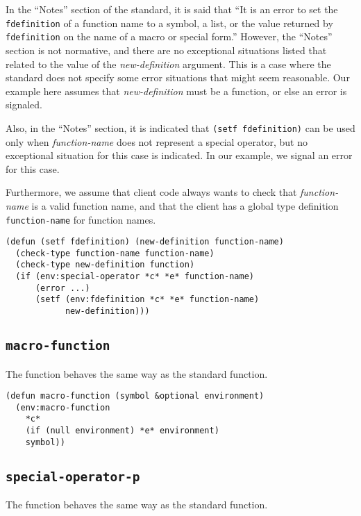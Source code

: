 In the ``Notes'' section of the \commonlisp{} standard, it is said
that ``It is an error to set the \texttt{fdefinition} of a function
name to a symbol, a list, or the value returned by
\texttt{fdefinition} on the name of a macro or special form.''
However, the ``Notes'' section is not normative, and there are no
exceptional situations listed that related to the value of the
\textit{new-definition} argument.  This is a case where the standard
does not specify some error situations that might seem reasonable.
Our example here assumes that \textit{new-definition} must be a
function, or else an error is signaled.

Also, in the ``Notes'' section, it is indicated that \texttt{(setf
  fdefinition)} can be used only when \textit{function-name} does not
represent a special operator, but no exceptional situation for this
case is indicated.  In our example, we signal an error for this case.

Furthermore, we assume that client code always wants to check that
\textit{function-name} is a valid function name, and that the client
has a global type definition \texttt{function-name} for function
names.

\begin{verbatim}
(defun (setf fdefinition) (new-definition function-name)
  (check-type function-name function-name)
  (check-type new-definition function)
  (if (env:special-operator *c* *e* function-name)
      (error ...)
      (setf (env:fdefinition *c* *e* function-name)
            new-definition)))
\end{verbatim}

\subsection{\texttt{macro-function}}

The \sysname{} function behaves the same way as the standard function.

\begin{verbatim}
(defun macro-function (symbol &optional environment)
  (env:macro-function
    *c*
    (if (null environment) *e* environment)
    symbol))
\end{verbatim}

\subsection{\texttt{special-operator-p}}

The \sysname{} function behaves the same way as the standard function.

